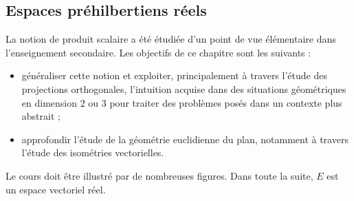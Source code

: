 
\subsection{Espaces préhilbertiens réels}
\begin{itshape}
La notion de produit scalaire a été étudiée d'un point de vue élémentaire
dans l'enseignement secondaire. Les objectifs  de ce chapitre sont les suivants :
\begin{itemize}
\item
généraliser cette notion et  exploiter, principalement à travers l'étude des projections orthogonales, l'intuition acquise dans des situations géométriques en dimension $2$ ou $3$ pour traiter des problèmes posés dans un contexte plus abstrait ;
\item
approfondir l'étude de la géométrie euclidienne du plan, notamment à travers l'étude des isométries vectorielles.
\end{itemize}
Le cours doit être illustré par de nombreuses figures. Dans toute la suite, $E$ est un espace vectoriel réel.
\end{itshape}

\begin{parcolumns}[rulebetween,distance=2.5cm]{2}
  \colplacechunks

  \colchunk{}
  \colplacechunks
\end{parcolumns}

\begin{parcolumns}[rulebetween,distance=2.5cm]{2}
  \colchunk{}
  \colplacechunks

  \colplacechunks
  
  \colchunk{}
  \colplacechunks

  \colchunk{}
  \colplacechunks
  \end{parcolumns}

